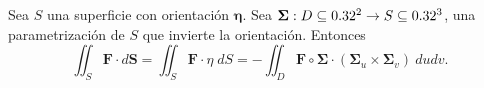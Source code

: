 \begin{obs}
    Sea $S$ una superficie con orientaci\'on $\boldsymbol{\eta}$. Sea $\boldsymbol{\Sigma}:D\subseteq0.32^2\to S\subseteq0.32^3$, una parametrizaci\'on de $S$ que invierte la orientaci\'on. Entonces
    \[
        \iint_S \mathbf{F}\cdot d\mathbf{S} = \iint_S \mathbf{F}\cdot\eta\;dS=-\iint_D \mathbf{F}\circ\boldsymbol{\Sigma}\cdot(\boldsymbol{\Sigma}_u\times\boldsymbol{\Sigma}_v)\:dudv.
    \]
\end{obs}


